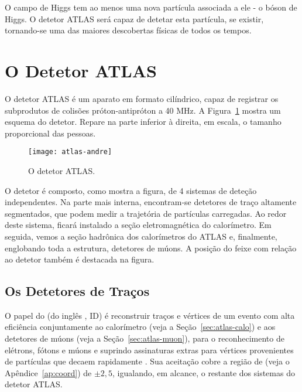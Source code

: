 O campo de Higgs tem ao menos uma nova partícula associada a ele - o bóson de
Higgs. O detetor ATLAS será capaz de detetar esta partícula, se existir,
tornando-se uma das maiores descobertas físicas de todos os tempos.

\section{O Detetor ATLAS}

O detetor ATLAS é um aparato em formato cilíndrico, capaz de registrar os
subprodutos de colisões próton-antipróton a 40 MHz. A
Figura~\ref{fig:atlas-scheme} mostra um esquema do detetor. Repare na parte
inferior à direita, em escala, o tamanho proporcional das pessoas.

\begin{figure}
\begin{center}
\texttt{[image: atlas-andre]}
\end{center}
\caption{O detetor ATLAS.}
\label{fig:atlas-scheme}
\end{figure}

O detetor  é composto, como mostra a figura, de 4 sistemas de
deteção independentes. Na parte mais interna, encontram-se detetores de traço
altamente segmentados, que podem medir a trajetória de partículas
carregadas. Ao redor deste sistema, ficará instalado a seção eletromagnética
do calorímetro. Em seguida, vemos a seção hadrônica dos calorímetros do ATLAS
e, finalmente, englobando toda a estrutura, detetores de múons. A posição do
feixe com relação ao detetor também é destacada na figura.

\subsection{Os Detetores de Traços}
\label{sec:atlas-id}

O papel do  (do inglês , ID) é
reconstruir traços e vértices de um evento com alta eficiência conjuntamente
ao calorímetro (veja a Seção~\ref{sec:atlas-calo}) e aos detetores de múons
(veja a Seção~\ref{sec:atlas-muon}), para o reconhecimento de elétrons, fótons
e múons e suprindo assinaturas extras para vértices provenientes de partículas
que decaem rapidamente \cite{atlas-id-tdr}. Sua aceitação cobre a região de
 (veja o Apêndice~\ref{ap:coord}) de $\pm2,5$, igualando,
em alcance, o restante dos sistemas do detetor ATLAS.


